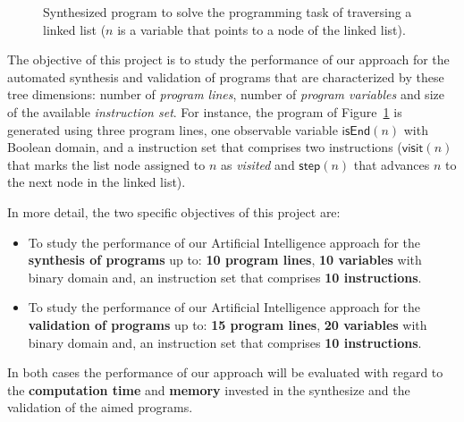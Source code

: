 \documentclass[10pt,a4paper]{paper}
\begin{document}
\begin{figure}[hbt!]
\begin{center}
\end{center}
\caption{\small Synthesized program to solve the programming task of traversing a linked list ($n$ is a variable that points to a node of the linked list).}
\label{fig:list}
\end{figure}

The objective of this project is to study the performance of our approach for the automated synthesis and validation of programs that are characterized by these tree dimensions: number of {\em program lines}, number of {\em program variables} and size of the available {\em instruction set}. For instance, the program of Figure~\ref{fig:list} is generated using three program lines, one observable variable $\mathsf{isEnd}(n)$ with Boolean domain, and a instruction set that comprises two instructions ($\mathsf{visit}(n)$ that marks the list node assigned to $n$ as {\em visited} and $\mathsf{step}(n)$ that advances $n$ to the next node in the linked list).

In more detail, the two specific objectives of this project are:
\begin{itemize}
\item To study the performance of our Artificial Intelligence approach for the {\bf synthesis of programs} up to: {\bf 10 program lines}, {\bf 10 variables} with binary domain and, an instruction set that comprises {\bf 10 instructions}. 
\item To study the performance of our Artificial Intelligence approach for the {\bf validation of programs} up to: {\bf 15 program lines}, {\bf 20 variables} with binary domain and, an instruction set that comprises {\bf 10 instructions}. 
\end{itemize}
In both cases the performance of our approach will be evaluated with regard to the {\bf computation time} and {\bf memory} invested in the synthesize and the validation of the aimed programs.
\end{document}
